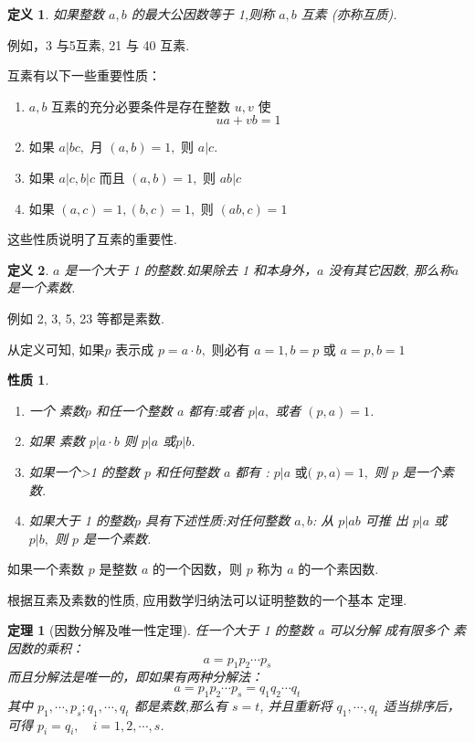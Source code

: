 \documentclass[13pt]{beamer}
\newtheorem{thm}{定理}
\newtheorem*{defi}{定义}
\newtheorem*{prop}{性质}
\begin{document}
\begin{frame}
\begin{defi}
	如果整数 $a, b$ 的最大公因数等于 1,则称 $a, b$ \alert{互素} (亦称互质).
\end{defi}
例如，3 与5互素, 21 与 40 互素.

互素有以下一些重要性质：
\begin{enumerate}
\item $a ,b$ 互素的充分必要条件是存在整数 $u, v$ 使
\[
u a+v b=1
\]
\item 如果 $a | b c,$ 月 $(a, b)=1,$ 则 $a | c$.
\item 如果 $a|c, b| c$ 而且 $(a, b)=1,$ 则 $a b | c$
\item 如果 $(a, c)=1,(b, c)=1,$ 则 $(a b, c)=1$
\end{enumerate}
这些性质说明了互素的重要性. 
\end{frame}


 
 \begin{frame}


\begin{defi}
	$a$ 是一个大于 1 的整数.如果除去 1 和本身外，$a$ 没有其它因数, 那么称$a$是一个\alert{素数}.
\end{defi}
例如 2, 3, 5, 23 等都是素数.  

从定义可知, 如果$p$ 表示成 $p=a \cdot b,$ 则必有 $a=1, b=p$ 或 $a=p, b=1$ 

\begin{prop}
\begin{enumerate}
\item  一个 素数$p$ 和任一个整数 $a$ 都有:或者 $p | a,$ 或者 $(p, a)=1$.
\item 如果 素数 $p | a \cdot b$ 则 $p | a$ 或$p| b$.
\item  如果一个>1 的整数 $p$ 和任何整数 $a$ 都有 : $p | a \text { 或( } p, a)=1,$ 则 $p$
是一个素数.
\item 如果大于 1 的整数$p$ 具有下述性质:对任何整数 $a , b$: 从 $p | a b$ 可推 出 $p | a$ 或 $p | b,$ 则 $p$ 是一个素数.  
\end{enumerate}
\end{prop}
如果一个素数  $p$ 是整数 $a$ 的一个因数，则 $p$ 称为 $a$ 的一个素因数.
 \end{frame}


 \begin{frame}
根据互素及素数的性质, 应用数学归纳法可以证明整数的一个基本
定理. 
\begin{thm}[因数分解及唯一性定理]
任一个大于 1 的整数 a 可以分解 成有限多个 素因数的乘积：
\[
a=p_{1} p_{2} \cdots p_{s}
\]
而且分解法是唯一的，即如果有两种分解法：
\[
a=p_{1} p_{2} \cdots p_{s}= q_{1} q_{2} \cdots q_{t}
\]
其中 $p_{1}, \cdots, p_{s} ; q_{1}, \cdots, q_{t}$ 都是素数,那么有 $s=t$,  并且重新将 $q_{1}, \cdots, q_{t}$ 适当排序后，可得
$p_{i}=q_{i}, \quad i=1,2, \cdots, s$.
\end{thm}
\end{frame}
\end{document}

